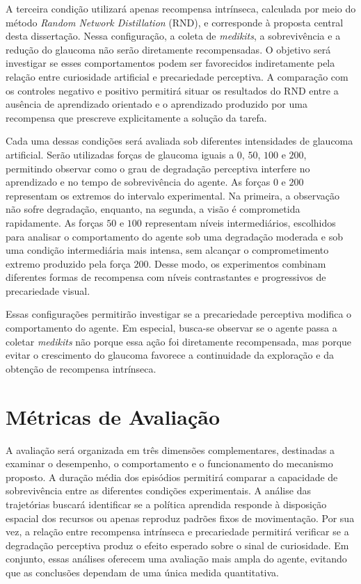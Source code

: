 A terceira condição utilizará apenas recompensa intrínseca, calculada por meio do método \textit{Random Network Distillation} (RND), e corresponde à proposta central desta dissertação. Nessa configuração, a coleta de \textit{medikits}, a sobrevivência e a redução do glaucoma não serão diretamente recompensadas. O objetivo será investigar se esses comportamentos podem ser favorecidos indiretamente pela relação entre curiosidade artificial e precariedade perceptiva. A comparação com os controles negativo e positivo permitirá situar os resultados do RND entre a ausência de aprendizado orientado e o aprendizado produzido por uma recompensa que prescreve explicitamente a solução da tarefa.

Cada uma dessas condições será avaliada sob diferentes intensidades de glaucoma artificial. Serão utilizadas forças de glaucoma iguais a $0$, $50$, $100$ e $200$, permitindo observar como o grau de degradação perceptiva interfere no aprendizado e no tempo de sobrevivência do agente. As forças $0$ e $200$ representam os extremos do intervalo experimental. Na primeira, a observação não sofre degradação, enquanto, na segunda, a visão é comprometida rapidamente. As forças $50$ e $100$ representam níveis intermediários, escolhidos para analisar o comportamento do agente sob uma degradação moderada e sob uma condição intermediária mais intensa, sem alcançar o comprometimento extremo produzido pela força $200$. Desse modo, os experimentos combinam diferentes formas de recompensa com níveis contrastantes e progressivos de precariedade visual.

Essas configurações permitirão investigar se a precariedade perceptiva modifica o comportamento do agente. Em especial, busca-se observar se o agente passa a coletar \textit{medikits} não porque essa ação foi diretamente recompensada, mas porque evitar o crescimento do glaucoma favorece a continuidade da exploração e da obtenção de recompensa intrínseca.

\section{Métricas de Avaliação}
\label{sec:metricas-de-avaliacao}

A avaliação será organizada em três dimensões complementares, destinadas a examinar o desempenho, o comportamento e o funcionamento do mecanismo proposto. A duração média dos episódios permitirá comparar a capacidade de sobrevivência entre as diferentes condições experimentais. A análise das trajetórias buscará identificar se a política aprendida responde à disposição espacial dos recursos ou apenas reproduz padrões fixos de movimentação. Por sua vez, a relação entre recompensa intrínseca e precariedade permitirá verificar se a degradação perceptiva produz o efeito esperado sobre o sinal de curiosidade. Em conjunto, essas análises oferecem uma avaliação mais ampla do agente, evitando que as conclusões dependam de uma única medida quantitativa.

